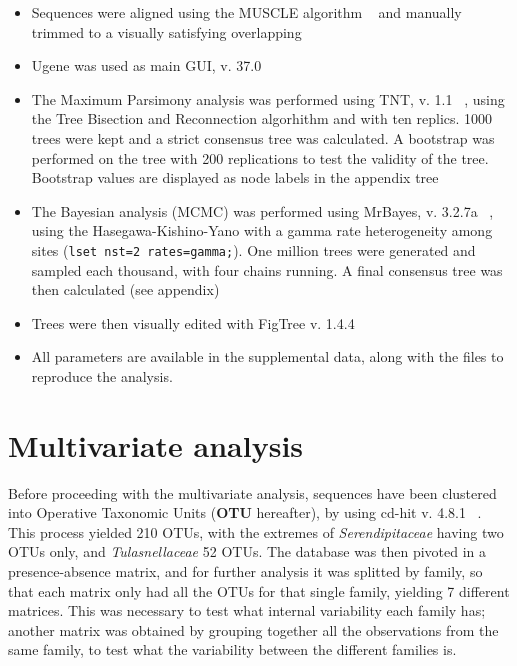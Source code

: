\begin{itemize}
\item Sequences were aligned using the MUSCLE algorithm ~\citep{edgar2004} and manually trimmed to a visually satisfying overlapping

\item Ugene was used as main GUI, v. 37.0 ~\citep{okonechnikov2012}

\item The Maximum Parsimony analysis was performed using TNT, v. 1.1 ~\citep{tnt}, using the Tree Bisection and Reconnection algorhithm and with ten replics. 1000 trees were kept and a strict consensus tree was calculated. A bootstrap was performed on the tree with 200 replications to test the validity of the tree. Bootstrap values are displayed as node labels in the appendix tree

\item The Bayesian analysis (MCMC) was performed using MrBayes, v. 3.2.7a ~\citep{huelsenbeck2001}, using the Hasegawa-Kishino-Yano with a gamma rate heterogeneity among sites (\texttt{lset nst=2 rates=gamma;}). One million trees were generated and sampled each thousand, with four chains running. A final consensus tree was then calculated (see appendix)

\item Trees were then visually edited with FigTree v. 1.4.4

\item All parameters are available in the supplemental data, along with the files to reproduce the analysis.

\end{itemize}

\chapter{Multivariate analysis}
\label{multivariateanalysis}

Before proceeding with the multivariate analysis, sequences have been clustered into Operative Taxonomic Units (\textbf{OTU} hereafter), by using cd-hit v. 4.8.1 ~\citep{li2001}. This process yielded 210 OTUs, with the extremes of \emph{Serendipitaceae} having two OTUs only, and \emph{Tulasnellaceae} 52 OTUs.
The database was then pivoted in a presence-absence matrix, and for further analysis it was splitted by family, so that each matrix only had all the OTUs for that single family, yielding 7 different matrices. This was necessary to test what internal variability each family has; another matrix was obtained by grouping together all the observations from the same family, to test what the variability between the different families is.

